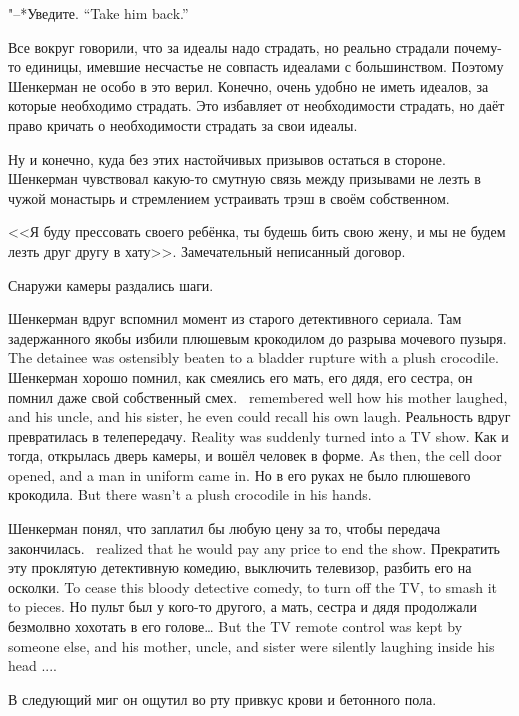 {"--*Уведите.}
{``Take him back.''}

\asterism

\textspace

Все вокруг говорили, что за идеалы надо страдать, но реально страдали почему-то единицы, имевшие несчастье не совпасть идеалами с большинством.
Поэтому Шенкерман не особо в это верил.
Конечно, очень удобно не иметь идеалов, за которые необходимо страдать.
Это избавляет от необходимости страдать, но даёт право кричать о необходимости страдать за свои идеалы.

Ну и конечно, куда без этих настойчивых призывов остаться в стороне.
Шенкерман чувствовал какую-то смутную связь между призывами не лезть в чужой монастырь и стремлением устраивать трэш в своём собственном.

<<Я буду прессовать своего ребёнка, ты будешь бить свою жену, и мы не будем лезть друг другу в хату>>.
Замечательный неписанный договор.

Снаружи камеры раздались шаги.

Шенкерман вдруг вспомнил момент из старого детективного сериала.
{Там задержанного якобы избили плюшевым крокодилом до разрыва мочевого пузыря.}
{The detainee was ostensibly beaten to a bladder rupture with a plush crocodile.}
{Шенкерман хорошо помнил, как смеялись его мать, его дядя, его сестра, он помнил даже свой собственный смех.}
{\Shenkerman\ remembered well how his mother laughed, and his uncle, and his sister, he even could recall his own laugh.}
{Реальность вдруг превратилась в телепередачу.}
{Reality was suddenly turned into a TV show.}
{Как и тогда, открылась дверь камеры, и вошёл человек в форме.}
{As then, the cell door opened, and a man in uniform came in.}
{Но в его руках не было плюшевого крокодила.}
{But there wasn't a plush crocodile in his hands.}

{Шенкерман понял, что заплатил бы любую цену за то, чтобы передача закончилась.}
{\Shenkerman\ realized that he would pay any price to end the show.}
{Прекратить эту проклятую детективную комедию, выключить телевизор, разбить его на осколки.}
{To cease this bloody detective comedy, to turn off the TV, to smash it to pieces.}
{Но пульт был у кого-то другого, а мать, сестра и дядя продолжали безмолвно хохотать в его голове\dots}
{But the TV remote control was kept by someone else, and his mother, uncle, and sister were silently laughing inside his head ....}

В следующий миг он ощутил во рту привкус крови и бетонного пола.

